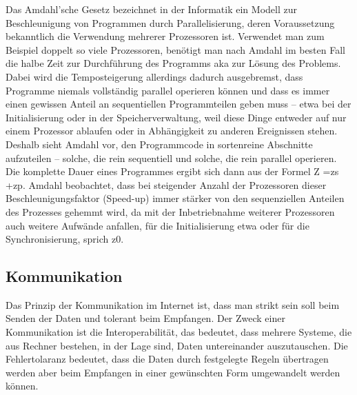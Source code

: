 \documentclass[a4paper,12pt]{article}
\begin{document}
Das Amdahl’sche Gesetz bezeichnet in der Informatik ein Modell zur Beschleunigung von Programmen durch Parallelisierung, deren Voraussetzung bekanntlich die Verwendung mehrerer Prozessoren ist. Verwendet man zum Beispiel doppelt so viele Prozessoren, benötigt man nach Amdahl im besten Fall die halbe Zeit zur Durchführung des Programms aka zur Lösung des Problems. Dabei wird die Temposteigerung allerdings dadurch ausgebremst, dass Programme niemals vollständig parallel operieren können und dass es immer einen gewissen Anteil an sequentiellen Programmteilen geben muss – etwa bei der Initialisierung oder in der Speicherverwaltung, weil diese Dinge entweder auf nur einem Prozessor ablaufen oder in Abhängigkeit zu anderen Ereignissen stehen. Deshalb sieht Amdahl vor, den Programmcode in sortenreine Abschnitte aufzuteilen – solche, die rein sequentiell und solche, die rein parallel operieren. Die komplette Dauer eines Programmes ergibt sich dann aus der Formel Z =zs +zp.
Amdahl beobachtet, dass bei steigender Anzahl der Prozessoren dieser Beschleunigungsfaktor (Speed-up) immer stärker von den sequenziellen Anteilen des Prozesses gehemmt wird, da mit der Inbetriebnahme weiterer Prozessoren auch weitere Aufwände anfallen, für die Initialisierung etwa oder für die Synchronisierung, sprich z0.
\cite{parallelprogramming}
\newpage
\noindent
\subsection{Kommunikation}
Das Prinzip der Kommunikation im Internet ist, dass man strikt sein soll beim Senden der Daten und tolerant beim Empfangen. Der Zweck einer Kommunikation ist die Interoperabilität, das bedeutet, 
dass mehrere Systeme, die aus Rechner bestehen, in der Lage sind, Daten untereinander auszutauschen. Die Fehlertolaranz bedeutet, dass die Daten durch festgelegte Regeln übertragen werden aber beim Empfangen in einer
gewünschten Form umgewandelt werden können.
\end{document}
